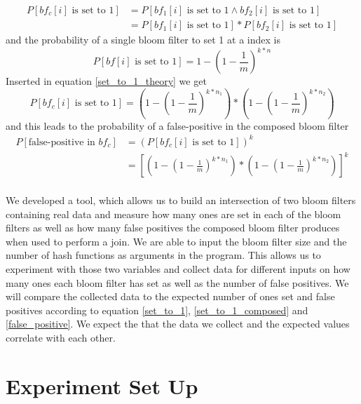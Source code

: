 \documentclass[12]{scrartcl}
\begin{document}
\begin{equation}
\label{set_to_1_theory}
\begin{split}
	P[bf_c[i] \text{ is set to 1}] &= P[bf_1[i] \text{ is set to 1} \wedge bf_2[i] \text{ is set to 1}]\\
	&= P[bf_1[i] \text{ is set to 1}] * P[bf_2[i] \text{ is set to 1}]
\end{split}
\end{equation}
and the probability of a single bloom filter to set 1 at a index is
\begin{equation}
\label{set_to_1}
P[bf[i] \text{ is set to 1}] = 1-(1-\frac{1}{m})^{k*n}
\end{equation}
Inserted in equation \ref{set_to_1_theory} we get
\begin{equation}
\label{set_to_1_composed}
P[bf_c[i] \text{ is set to 1}] = (1-(1-\frac{1}{m})^{k*n_1}) * (1-(1-\frac{1}{m})^{k*n_2})
\end{equation}
and this leads to the probability of a false-positive in the composed bloom filter
\begin{equation}
\label{false_positive}
\begin{split}
P[\text{false-positive in }bf_c] &= (P[bf_c[i] \text{ is set to 1}])^k\\
&= [(1-(1-\frac{1}{m})^{k*n_1}) * (1-(1-\frac{1}{m})^{k*n_2})]^k
\end{split}
\end{equation}\\
We developed a tool, which allows us to build an intersection of two bloom filters containing real data and measure how many ones are set in each of the bloom filters as well as how many false positives the composed bloom filter produces when used to perform a join. We are able to input the bloom filter size and the number of hash functions as arguments in the program. This allows us to experiment with those two variables and collect data for different inputs on how many ones each bloom filter has set as well as the number of false positives. We will compare the collected data to the expected number of ones set and false positives according to equation \ref{set_to_1}, \ref{set_to_1_composed} and \ref{false_positive}. We expect the that the data we collect and the expected values correlate with each other.
\section{Experiment Set Up}
\end{document}
